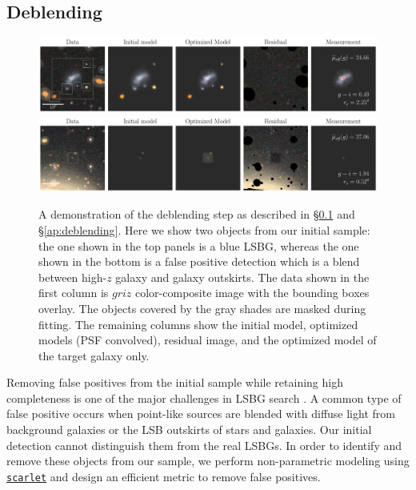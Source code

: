 \documentclass[twocolumn,astrosymb,twocolappendix]{aastex631}
\newcommand{\code}[1]{\texttt{#1}}
\begin{document}
\begin{CJK*}{UTF8}{gbsn}
\subsection{Deblending}\label{sec:deblending}

\begin{figure}
	\vbox{ 
		\centering
		\includegraphics[width=1\linewidth]{vanilla_scarlet_demo.pdf}
		\includegraphics[width=1\linewidth]{vanilla_scarlet_demo2.pdf}
	}
	\caption{A demonstration of the deblending step as described in \S\ref{sec:deblending} and \S\ref{ap:deblending}. Here we show two objects from our initial sample: the one shown in the top panels is a blue LSBG, whereas the one shown in the bottom is a false positive detection which is a blend between high-$z$ galaxy and galaxy outskirts. The data shown in the first column is $griz$ color-composite image with the bounding boxes overlay. The objects covered by the gray shades are masked during fitting. The remaining columns show the initial model, optimized models (PSF convolved), residual image, and the optimized model of the target galaxy only. 
	}
	\label{fig:vanilla_scarlet_demo}
\end{figure}

Removing false positives from the initial sample while retaining high completeness is one of the major challenges in LSBG search \citep[e.g.,][]{vanDokkum2015,Koda2015,Yagi2016,Greco2018,SAGA-I,Zaritsky2019,Zaritsky2021,Tanoglidis2021,Zaritsky2022}. A common type of false positive occurs when point-like sources are blended with diffuse light from background galaxies or the LSB outskirts of stars and galaxies. Our initial detection cannot distinguish them from the real LSBGs. In order to identify and remove these objects from our sample, we perform non-parametric modeling using \href{https://pmelchior.github.io/scarlet/}{\code{scarlet}} \citep{Melchior2018} and design an efficient metric to remove false positives.



\end{CJK*}
\end{document}
